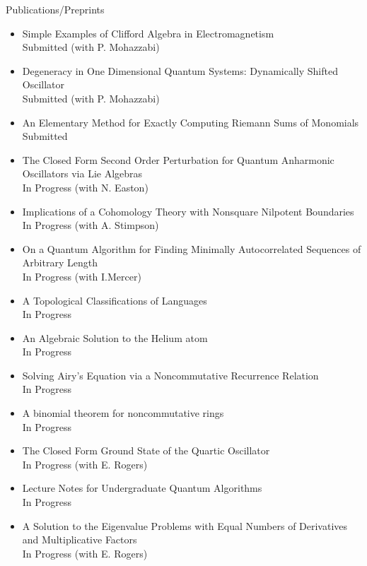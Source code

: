 \documentclass{resume} %
\begin{document}
\begin{rSection}{Publications/Preprints}
\begin{itemize}
\item Simple Examples of Clifford Algebra in Electromagnetism\\
Submitted (with P. Mohazzabi)\\

\item Degeneracy in One Dimensional Quantum Systems: Dynamically Shifted Oscillator\\
Submitted (with P. Mohazzabi)\\

\item An Elementary Method for Exactly Computing Riemann Sums of Monomials\\
Submitted

\item The Closed Form Second Order Perturbation for Quantum Anharmonic Oscillators via Lie Algebras\\
In Progress (with N. Easton)

\item Implications of a Cohomology Theory with Nonsquare Nilpotent Boundaries\\
In Progress (with A. Stimpson)\\

\item On a Quantum Algorithm for Finding Minimally Autocorrelated Sequences of Arbitrary Length\\
In Progress (with I.Mercer)

\item A Topological Classifications of Languages\\
In Progress

\item An Algebraic Solution to the Helium atom\\
In Progress

\item Solving Airy's Equation via a Noncommutative Recurrence Relation\\
In Progress

\item A binomial theorem for noncommutative rings\\
In Progress

\item The Closed Form Ground State of the Quartic Oscillator\\
In Progress (with E.  Rogers)

\item Lecture Notes for Undergraduate Quantum Algorithms\\
In Progress

\item A Solution to the Eigenvalue Problems with Equal Numbers of Derivatives and Multiplicative Factors\\
In Progress (with E. Rogers)

\end{itemize}

\end{rSection}
\end{document}
